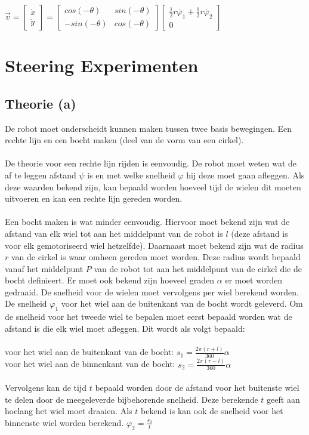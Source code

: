\documentclass[a4paper]{article}
\begin{document}
$
\vec{v}=
\begin{bmatrix}
\dot{x} \\
\dot{y}
\end{bmatrix}
=
\begin{bmatrix}
cos(-\theta) & sin(-\theta)\\
-sin(-\theta) & cos(-\theta)
\end{bmatrix}
\begin{bmatrix}
\frac{1}{2}r\dot{\varphi_{1}} + \frac{1}{2}r\dot{\varphi_{2}} \\
0
\end{bmatrix}
$

\section{Steering Experimenten}

\subsection{Theorie (a)}
De robot moet onderscheidt kunnen maken tussen twee basis bewegingen. Een rechte lijn en een bocht maken (deel van de vorm van een cirkel).\\
\\
De theorie voor een rechte lijn rijden is eenvoudig. De robot moet weten wat de af te leggen afstand $\psi$ is en met welke snelheid $\varphi$ hij deze moet gaan afleggen. Als deze waarden bekend zijn, kan bepaald worden hoeveel tijd de wielen dit moeten uitvoeren en kan een rechte lijn gereden worden.\\
\\
Een bocht maken is wat minder eenvoudig. Hiervoor moet bekend zijn wat de afstand van elk wiel tot aan het middelpunt van de robot is $l$ (deze afstand is voor elk gemotoriseerd wiel hetzelfde). Daarnaast moet bekend zijn wat de radius $r$ van de cirkel is waar omheen gereden moet worden. Deze radius wordt bepaald vanaf het middelpunt $P$ van de robot tot aan het middelpunt van de cirkel die de bocht definieert. Er moet ook bekend zijn hoeveel graden $\alpha$ er moet worden gedraaid. De snelheid voor de wielen moet vervolgens per wiel berekend worden. De snelheid $\varphi_1$ voor het wiel aan de buitenkant van de bocht wordt geleverd. Om de snelheid voor het tweede wiel te bepalen moet eerst bepaald worden wat de afstand is die elk wiel moet afleggen. Dit wordt als volgt bepaald:\\\\
voor het wiel aan de buitenkant van de bocht:
$s_1 = \frac{2\pi(r + l)}{360}\alpha$\\
voor het wiel aan de binnenkant van de bocht:
$s_2 = \frac{2\pi(r - l)}{360}\alpha$\\\\
Vervolgens kan de tijd $t$ bepaald worden door de afstand voor het buitenste wiel te delen door de meegeleverde bijbehorende snelheid. Deze berekende $t$ geeft aan hoelang het wiel moet draaien. Als $t$ bekend is kan ook de snelheid voor het binnenste wiel worden berekend. $\varphi_2=\frac{s_2}{t}$
\end{document}
